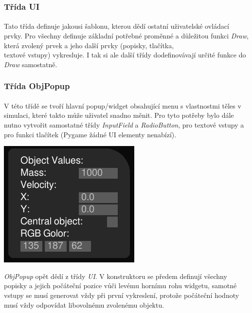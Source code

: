\documentclass[a4paper, 12pt]{article}
\begin{document}
\subsubsection{Třída UI}
\paragraph{}
Tato třída definuje jakousi šablonu, kterou dědí ostatní uživatelské ovládací
prvky. Pro všechny definuje základní potřebné proměnné a důležitou funkci
\emph{Draw}, která zvolený prvek a jeho další prvky (popisky, tlačítka, \\textové
vstupy) vykresluje. I tak si ale další třídy dodefinovávají určité funkce do
\emph{Draw} samostatně.
\\
\subsubsection{Třída ObjPopup}
\paragraph{}
V této třídě se tvoří hlavní popup/widget obsahující menu s vlastnostmi těles v
simulaci, které takto může uživatel snadno měnit. Pro tyto potřeby bylo dále
nutno vytvořit samostatné třídy \emph{InputField} a \emph{RadioButton}, pro
textové vstupy a pro funkci tlačítek (Pygame žádné UI elementy nenabízí).

\begin{center}
    \includegraphics[width=0.5\linewidth]{p2_crop.png}
\end{center}

\emph{ObjPopup} opět dědí z třídy \emph{UI}. V konstruktoru se předem definují
všechny popisky a jejich počáteční pozice vůči levému hornímu rohu widgetu,
samotné vstupy se musí generovat vždy při první vykreslení, protože počáteční
hodnoty musí vždy odpovídat libovolnému zvolenému objektu. 
\end{document}
